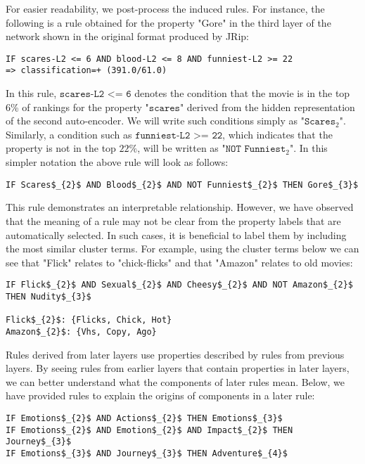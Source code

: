 For easier readability, we post-process the induced rules. For instance, the following is a rule obtained for the property "Gore" in the third layer of the network shown in the original format produced by JRip:

\begin{lstlisting}[mathescape=true]
IF scares-L2 <= 6 AND blood-L2 <= 8 AND funniest-L2 >= 22
=> classification=+ (391.0/61.0)
\end{lstlisting}

\noindent In this rule, $\texttt{scares-L2 <= 6}$ denotes the condition that the movie is in the top 6\% of rankings for the property "$\texttt{scares}$" derived from the hidden representation of the second auto-encoder. We will write such conditions simply as "$\texttt{Scares$_{2}$}$". Similarly, a condition such as $\texttt{funniest-L2 >= 22}$, which indicates that the property is not in the top $22\%$, will be written as "$\texttt{NOT Funniest}$$_{2}$". In this simpler notation the above rule will look as follows: %

\begin{lstlisting}[mathescape=true]
IF Scares$_{2}$ AND Blood$_{2}$ AND NOT Funniest$_{2}$ THEN Gore$_{3}$
\end{lstlisting}

This rule demonstrates an interpretable relationship. However, we have observed that the meaning of a rule may not be clear from the property labels that are automatically selected. In such cases, it is beneficial to label them by including the most similar cluster terms. For example, using the cluster terms below we can see that "Flick" relates to "chick-flicks" and that "Amazon" relates to old movies:

\begin{lstlisting}[mathescape=true]
IF Flick$_{2}$ AND Sexual$_{2}$ AND Cheesy$_{2}$ AND NOT Amazon$_{2}$ THEN Nudity$_{3}$

Flick$_{2}$: {Flicks, Chick, Hot}
Amazon$_{2}$: {Vhs, Copy, Ago}
\end{lstlisting}

Rules derived from later layers use properties described by rules from previous layers. By seeing rules from earlier layers that contain properties in later layers, we can better understand what the components of later rules mean. Below, we have provided rules to explain the origins of components in a later rule:

\begin{lstlisting}[mathescape=true]
IF Emotions$_{2}$ AND Actions$_{2}$ THEN Emotions$_{3}$ 
IF Emotions$_{2}$ AND Emotion$_{2}$ AND Impact$_{2}$ THEN Journey$_{3}$ 
IF Emotions$_{3}$ AND Journey$_{3}$ THEN Adventure$_{4}$ 
\end{lstlisting}

